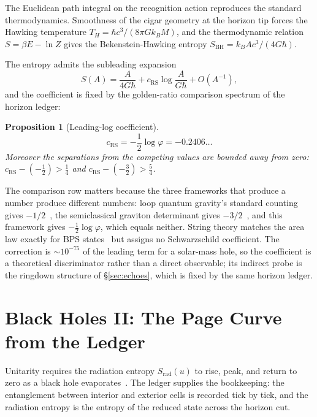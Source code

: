 \documentclass[11pt,letterpaper]{article}
\newtheorem{proposition}[theorem]{Proposition}
\theoremstyle{definition}
\newcommand{\phiG}{\varphi}
\newcommand{\RS}{\mathrm{RS}}
\newcommand{\BH}{\mathrm{BH}}
\newcommand{\half}{\tfrac{1}{2}}
\begin{document}
The Euclidean path integral on the recognition action reproduces the
standard thermodynamics.  Smoothness of the cigar geometry at the
horizon tip forces the Hawking temperature
$T_H=\hbar c^3/(8\pi G k_B M)$, and the thermodynamic relation
$S=\beta E-\ln Z$ gives the Bekenstein-Hawking entropy
$S_\BH=k_B A c^3/(4G\hbar)$.

The entropy admits the subleading expansion
\begin{equation}\label{eq:entropy-expansion}
S(A)=\frac{A}{4G\hbar}+c_\RS\log\frac{A}{G\hbar}+O(A^{-1}),
\end{equation}
and the coefficient is fixed by the golden-ratio comparison spectrum
of the horizon ledger:

\begin{proposition}[Leading-log coefficient]\label{prop:cRS}
\begin{equation}
c_\RS=-\frac{1}{2}\log\phiG=-0.2406\ldots
\end{equation}
Moreover the separations from the competing values are bounded away
from zero: $c_\RS-(-\half)>\tfrac14$ and
$c_\RS-(-\tfrac32)>\tfrac54$.
\end{proposition}

The comparison row matters because the three frameworks that produce a
number produce different numbers: loop quantum gravity's standard
counting gives $-1/2$~\cite{KaulMajumdar2000,GhoshPerez2011,
EngleNouiPerezPranzetti2010}, the semiclassical graviton determinant
gives $-3/2$~\cite{Sen2012}, and this framework gives
$-\half\log\phiG$, which equals neither.  String theory matches the
area law exactly for BPS states~\cite{StromingerVafa1996} but assigns
no Schwarzschild coefficient.  The correction is $\sim10^{-75}$ of the
leading term for a solar-mass hole, so the coefficient is a
theoretical discriminator rather than a direct observable; its
indirect probe is the ringdown structure of \S\ref{sec:echoes}, which
is fixed by the same horizon ledger.

\section{Black Holes II: The Page Curve from the Ledger}
\label{sec:page}

Unitarity requires the radiation entropy
$S_{\mathrm{rad}}(u)$ to rise, peak, and return to zero as a black
hole evaporates~\cite{PagePRL1993}.  The ledger supplies the
bookkeeping: the entanglement between interior and exterior cells is
recorded tick by tick, and the radiation entropy is the entropy of the
reduced state across the horizon cut.
\end{document}
